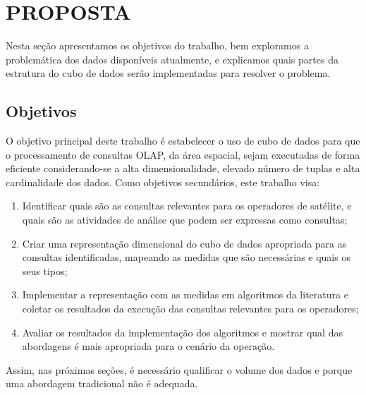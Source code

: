 
\chapter{PROPOSTA}\label{ch:prop}

Nesta seção apresentamos os objetivos do trabalho, bem exploramos a problemática dos dados disponíveis atualmente, e explicamos quais partes da estrutura do cubo de dados serão implementadas para resolver o problema.

\section{Objetivos}\label{ch:prop:obj}

O objetivo principal deste trabalho é estabelecer o uso de cubo de dados para que o processamento de consultas OLAP, da área espacial, sejam executadas de forma eficiente considerando-se a alta dimensionalidade, elevado número de tuplas e alta cardinalidade dos dados.
Como objetivos secundários, este trabalho visa:

\begin{enumerate}
\item Identificar quais são as consultas relevantes para os operadores de satélite, e quais são as atividades de análise que podem ser expressas como consultas;
\item Criar uma representação dimensional do cubo de dados apropriada para as consultas identificadas, mapeando as medidas que são necessárias e quais os seus tipos;
\item Implementar a representação com as medidas em algoritmos da literatura e coletar os resultados da execução das consultas relevantes para os operadores;
\item Avaliar os resultados da implementação dos algoritmos e mostrar qual das abordagens é mais apropriada para o cenário da operação.
\end{enumerate}

Assim, nas próximas seções, é necessário qualificar o volume dos dados e porque uma abordagem tradicional não é adequada.

